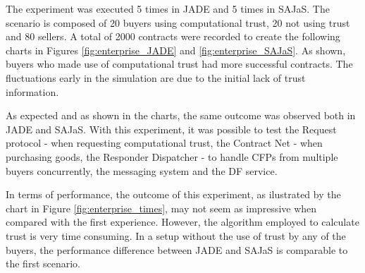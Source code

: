 The experiment was executed 5 times in JADE and 5 times in SAJaS. The scenario is composed of 20 buyers using computational trust, 20 not using trust and 80 sellers. A total of 2000 contracts were recorded to create the following charts in Figures \ref{fig:enterprise_JADE} and \ref{fig:enterprise_SAJaS}. As shown, buyers who made use of computational trust had more successful contracts. The fluctuations early in the simulation are due to the initial lack of trust information.

As expected and as shown in the charts, the same outcome was observed both in JADE and SAJaS. With this experiment, it was possible to test the Request protocol - when requesting computational trust, the Contract Net - when purchasing goods, the Responder Dispatcher - to handle CFPs from multiple buyers concurrently, the messaging system and the DF service.

In terms of performance, the outcome of this experiment, as ilustrated by the chart in Figure \ref{fig:enterprise_times}, may not seem as impressive when compared with the first experience. However, the algorithm employed to calculate trust is very time consuming. In a setup without the use of trust by any of the buyers, the performance difference between JADE and SAJaS is comparable to the first scenario.

